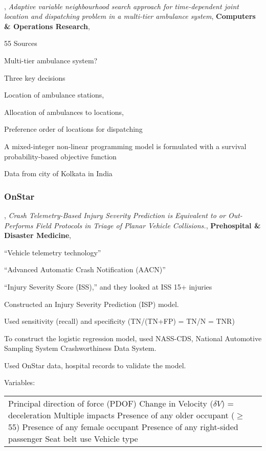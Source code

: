 \

\citep{NADAR2023106355},
{ \it Adaptive variable neighbourhood search approach for time-dependent joint location and dispatching problem in a multi-tier ambulance system},
{ \bf Computers \& Operations Research},

55 Sources

Multi-tier ambulance system?

Three key decisions

\qquad Location of ambulance stations, 

\qquad Allocation of ambulances to locations,

\qquad Preference order of locations for dispatching

A mixed-integer non-linear
programming model is formulated with a survival probability-based objective function

Data from city of Kolkata in India

\subsubsection{OnStar}

\citep{13793173920190801},
{\it Crash Telemetry-Based Injury Severity Prediction is Equivalent to or Out-Performs Field Protocols in Triage of Planar Vehicle Collisions.},
{\bf Prehospital \& Disaster Medicine},

``Vehicle telemetry technology''

``Advanced Automatic Crash Notification (AACN)''

``Injury Severity Score (ISS),'' and they looked at ISS 15+ injuries

Constructed an Injury Severity Prediction (ISP) model.

Used sensitivity (recall) and specificity (TN/(TN+FP) = TN/N = TNR)

To construct the logistic regression model, used NASS-CDS, National Automotive Sampling System Crashworthiness Data System.

Used OnStar data, hospital records to validate the model.

Variables:  
\begin{tabular}{l}
	Principal direction of force (PDOF) \cr
	Change in Velocity ($\delta V$) = deceleration \cr
	Multiple impacts\cr
	Presence of any older occupant ($\ge$ 55) \cr 
	Presence of any female occupant \cr
	Presence of any right-sided passenger \cr
	Seat belt use \cr
	Vehicle type \cr
\end{tabular}

